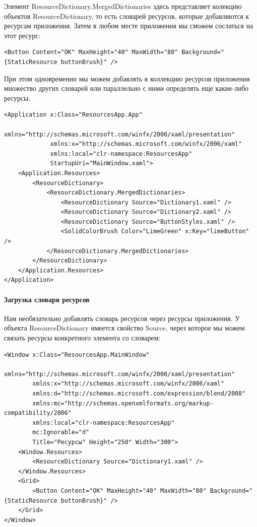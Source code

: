 Элемент ResourceDictionary.MergedDictionaries здесь представляет колекцию объектов ResourceDictionary, то есть словарей ресурсов, которые добавляются к ресурсам приложения. Затем в любом месте приложения мы сможем сослаться на этот ресурс:

\begin{verbatim}
<Button Content="OK" MaxHeight="40" MaxWidth="80" Background="{StaticResource buttonBrush}" />
\end{verbatim}


При этом одновременно мы можем добавлять в коллекцию ресурсов приложения множество других словарей или параллельно с ними определять еще какие-либо ресурсы:

\begin{verbatim}
<Application x:Class="ResourcesApp.App"
             xmlns="http://schemas.microsoft.com/winfx/2006/xaml/presentation"
             xmlns:x="http://schemas.microsoft.com/winfx/2006/xaml"
             xmlns:local="clr-namespace:ResourcesApp"
             StartupUri="MainWindow.xaml">
    <Application.Resources>
        <ResourceDictionary>
            <ResourceDictionary.MergedDictionaries>
                <ResourceDictionary Source="Dictionary1.xaml" />
                <ResourceDictionary Source="Dictionary2.xaml" />
                <ResourceDictionary Source="ButtonStyles.xaml" />
                <SolidColorBrush Color="LimeGreen" x:Key="limeButton" />
            </ResourceDictionary.MergedDictionaries>
        </ResourceDictionary>
    </Application.Resources>
</Application>
\end{verbatim}

\paragraph{Загрузка словаря ресурсов}
Нам необязательно добавлять словарь ресурсов через ресурсы приложения. У объекта ResourceDictionary имеется свойство Source, через которое мы можем связать ресурсы конкретного элемента со словарем:

\begin{verbatim}
<Window x:Class="ResourcesApp.MainWindow"
        xmlns="http://schemas.microsoft.com/winfx/2006/xaml/presentation"
        xmlns:x="http://schemas.microsoft.com/winfx/2006/xaml"
        xmlns:d="http://schemas.microsoft.com/expression/blend/2008"
        xmlns:mc="http://schemas.openxmlformats.org/markup-compatibility/2006"
        xmlns:local="clr-namespace:ResourcesApp"
        mc:Ignorable="d"
        Title="Ресурсы" Height="250" Width="300">
    <Window.Resources>
        <ResourceDictionary Source="Dictionary1.xaml" />
    </Window.Resources>
    <Grid>
        <Button Content="OK" MaxHeight="40" MaxWidth="80" Background="{StaticResource buttonBrush}" />
    </Grid>
</Window>
\end{verbatim}

